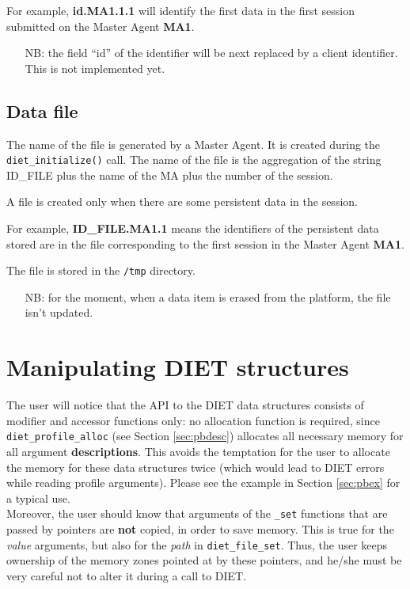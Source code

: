 For example, \textbf{id.MA1.1.1} will identify the first data
in the first session submitted on the Master Agent \textbf{MA1}.


\begin{itemize}
\item[NB:] the field ``id'' of the identifier will be next replaced by a
client identifier. This is not implemented yet.
\end{itemize}

\subsection{Data file}
\label{ssec:datafile}

The name of the file is generated by a Master Agent. It is created
during the \texttt{diet\_initialize()} call. The name of the file is
the aggregation of the string ID\_FILE plus the name of the MA plus
the number of the session.  

A file is created only when there are some persistent data in the
session.  

For example, \textbf{ID\_FILE.MA1.1} means the identifiers
of the persistent data stored are in the file corresponding to the
first session in the Master Agent \textbf{MA1}.

The file is stored in the \texttt{/tmp} directory.

\begin{itemize}
\item[NB:] for the moment, when a data item is erased from the platform, the
file isn't updated.
\end{itemize}


\section{Manipulating DIET structures}
\label{sec:manip}

The user will notice that the API to the DIET data structures consists of
modifier and accessor functions only: no allocation function is required, since
\texttt{diet\_profile\_alloc} (see Section \ref{sec:pbdesc}) allocates all
necessary memory for all argument \textbf{descriptions}. This avoids the
temptation for the user to allocate the memory for these data structures twice
(which would lead to DIET errors while reading profile arguments). Please see
the example in Section \ref{sec:pbex} for a typical use.
\\

Moreover, the user should know that arguments of the \texttt{\_set} functions
that are passed by pointers are \textbf{not} copied, in order to save memory.
This is true for the \emph{value} arguments, but also for the \emph{path} in
\texttt{diet\_file\_set}. Thus, the user keeps ownership of the memory zones
pointed at by these pointers, and he/she must be very careful not to alter it
during a call to DIET.

